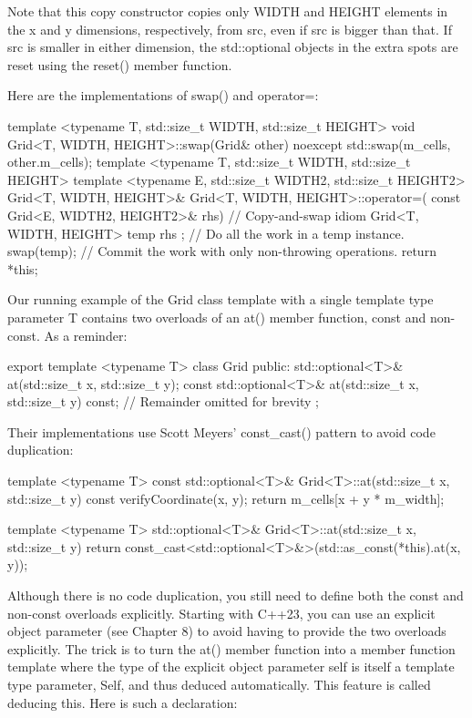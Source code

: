 Note that this copy constructor copies only WIDTH and HEIGHT elements in the x and y dimensions, respectively, from src, even if src is bigger than that. If src is smaller in either dimension, the std::optional objects in the extra spots are reset using the reset() member function.

Here are the implementations of swap() and operator=:


\begin{cpp}
template <typename T, std::size_t WIDTH, std::size_t HEIGHT>
void Grid<T, WIDTH, HEIGHT>::swap(Grid& other) noexcept
{
    std::swap(m_cells, other.m_cells);
}
template <typename T, std::size_t WIDTH, std::size_t HEIGHT>
template <typename E, std::size_t WIDTH2, std::size_t HEIGHT2>
Grid<T, WIDTH, HEIGHT>& Grid<T, WIDTH, HEIGHT>::operator=(
    const Grid<E, WIDTH2, HEIGHT2>& rhs)
{
    // Copy-and-swap idiom
    Grid<T, WIDTH, HEIGHT> temp { rhs }; // Do all the work in a temp instance.
    swap(temp); // Commit the work with only non-throwing operations.
    return *this;
}
\end{cpp}




Our running example of the Grid class template with a single template type parameter T contains two overloads of an at() member function, const and non-const. As a reminder:

\begin{cpp}
export template <typename T>
class Grid
{
    public:
        std::optional<T>& at(std::size_t x, std::size_t y);
        const std::optional<T>& at(std::size_t x, std::size_t y) const;
        // Remainder omitted for brevity
};
\end{cpp}

Their implementations use Scott Meyers’ const\_cast() pattern to avoid code duplication:

\begin{cpp}
template <typename T>
const std::optional<T>& Grid<T>::at(std::size_t x, std::size_t y) const
{
    verifyCoordinate(x, y);
    return m_cells[x + y * m_width];
}

template <typename T>
std::optional<T>& Grid<T>::at(std::size_t x, std::size_t y)
{
    return const_cast<std::optional<T>&>(std::as_const(*this).at(x, y));
}
\end{cpp}

Although there is no code duplication, you still need to define both the const and non-const overloads explicitly. Starting with C++23, you can use an explicit object parameter (see Chapter 8) to avoid having to provide the two overloads explicitly. The trick is to turn the at() member function into a member function template where the type of the explicit object parameter self is itself a template type parameter, Self, and thus deduced automatically. This feature is called deducing this. Here is such a declaration:

